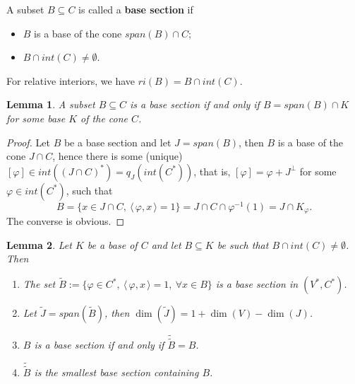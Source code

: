 \documentclass[12pt]{article}
\newtheorem{lemma}{Lemma}
\theoremstyle{definition}
\theoremstyle{remark}
\def\<{\langle\,}
\def\>{\,\rangle}
\begin{document}
\medskip
\noindent
A subset $B\subseteq C$ is called a \textbf{base section} if 
\begin{itemize}
\item $B$ is a base of the cone ${span}(B)\cap C$;
\item $B\cap int(C)\ne \emptyset$.

\end{itemize}
For relative interiors, we have $ri(B)=B\cap int(C)$. 


\medskip
\noindent


\begin{lemma}\label{lemma:base_sec} A subset $B\subseteq C$ is a base section if and only
if $B=span(B)\cap K$ for some base $K$ of the cone $C$. 

\end{lemma}


\begin{proof} Let $B$ be a base section and let $J=span(B)$, then $B$ is a base of the
cone $J\cap C$, hence there is some (unique) $[\varphi]\in int((J\cap C)^*)=q_J(int(C^*))$, that 
is, $[\varphi]=\varphi+J^\perp$ for some $\varphi\in int(C^*)$, such that 
\[
B=\{x\in J\cap C,\ \<\varphi,x\>=1\}=J\cap C\cap \varphi^{-1}(1)=J\cap K_\varphi.
\]
The converse is obvious.

\end{proof}



\begin{lemma} \label{lemma:bases}
Let $K$ be a base of $C$ and let $B\subseteq K$ be such that $B\cap int(C)\ne \emptyset$. Then
\begin{enumerate}
\item[(i)] The set $\tilde B:=\{\varphi\in C^*,\ \<\varphi,x\>=1,\ \forall x\in B\}$
 is a base section  in $(V^*,C^*)$.
 \item[(ii)] Let $\tilde J=span(\tilde B)$, then $\dim(\tilde J)=1+\dim(V)-\dim(J)$.
 \item[(iii)] $B$ is a base section if and only if  $\tilde{\tilde{B}}=B$.
 \item[(iv)] $\tilde{\tilde{B}}$ is the smallest base section containing $B$.
\end{enumerate}


\end{lemma}
\end{document}
